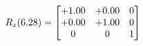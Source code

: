 \documentclass[preview]{standalone}
\begin{document}
\begin{align*}
\special{dvisvgm:raw <g id='unique000'>}R_{z}(6.28) = \begin{bmatrix}+1.00 & +0.00 & 0 \\+0.00 & +1.00 & 0 \\0 & 0 & 1\end{bmatrix}\special{dvisvgm:raw </g>}
\end{align*}
\end{document}

